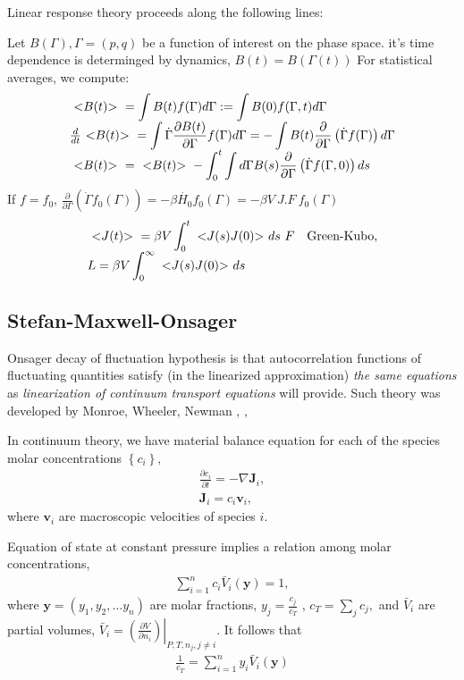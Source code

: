 \documentclass[a4paper, 11 pt]{article}
\theoremstyle{definition}
\theoremstyle{remark}
\newcommand{\dst} {\displaystyle}
\newcommand{\ds} {\dst}
\newcommand{\lt} {\ {\bf <}}
\newcommand{\rt} {{\bf >}\ }
\newcommand{\lb} {\left(}
\newcommand{\rb} {\right)}
\newcommand{\lbr} {\left\{}
\newcommand{\rbr} {\right\}}
\newcommand{\ld} {\left.}
\newcommand{\rv} {\right|}
\newcommand{\be} {\beta}
\newcommand{\bgea}{\begin{equation} \begin{array}{l} }
\newcommand{\enea}{ \end{array} \end{equation}}
\begin{document}
Linear response theory proceeds along the following lines:

Let $B (\Gamma), \Gamma = (p,q)$ be a function of interest on the phase space. it's time dependence is determinged by dynamics, $ B(t) = B (\Gamma (t)) $
For statistical averages, we compute:
\bgea
\lt B(t) \rt = \dst\int B(t) f(\Gamma) d\Gamma := \dst\int B(0) f(\Gamma,t) d\Gamma
\\
\frac{d}{dt} \lt B(t) \rt = \dst\int \dot{\Gamma}\frac{\partial B(t) }{\partial \Gamma} f (\Gamma) d\Gamma = - \dst\int   B(t) \frac{\partial  }{\partial \Gamma} \lb \dot{\Gamma} f (\Gamma)\rb  d\Gamma
\\
\lt B(t) \rt =   \lt B(t) \rt - \ds\int_0^t \dst\int d\Gamma B(s) \frac{\partial  }{\partial \Gamma} \lb \dot{\Gamma} f (\Gamma,0) \rb ds
\enea
If $f=f_0$,   $\frac{\partial  }{\partial \Gamma} \lb \dot{\Gamma} f_0 (\Gamma)\rb = - \be \dot{H_0} f_0 (\Gamma)= -   \be  V \  J.F \ f_0 (\Gamma)$
\bgea
\lt J(t) \rt =  \be V \dst\int_0^t \lt J(s) J(0) \rt ds \ F \quad \mbox{Green-Kubo},
\\
L =   \be V \dst\int_0^{\infty} \lt J(s) J(0) \rt ds
\enea

\subsection{Stefan-Maxwell-Onsager}
Onsager decay of fluctuation hypothesis is that autocorrelation functions of fluctuating quantities satisfy (in the linearized approximation)   {\it the same equations}  as {\it linearization of continuum transport equations} will provide. Such theory was developed by Monroe,  Wheeler, Newman \cite{mwn2006} , \cite{mwn2009} , \cite{mwn2015}


In continuum theory, we have material balance equation for each of the species molar concentrations  $\lbr c_i\rbr,$
\bgea
\dst \frac{\partial c_i}{\partial t} = - \nabla \mathbf{J}_i  ,
\\
\mathbf{J}_i  = c_i \mathbf{v}_i ,
\label{massbalance}
\enea
where $\mathbf{v}_i$ are macroscopic velocities of species $i$.

Equation of state at constant pressure implies a relation among molar concentrations,
\bgea
\dst\sum_{i=1}^n c_i \bar{V}_i \lb \mathbf{y} \rb =1,
\enea
where $\mathbf{y} = (y_1, y_2, \ldots y_n)$ are molar fractions,  $y_j = \frac{c_j}{c_T}$ , $c_T = \sum_j c_j,$ and $\bar{V}_i$ are
partial volumes, $\bar{V}_i =\ld \lb \dst\frac{\partial V}{\partial n_i}\rb \rv_{P,T, n_j,j\neq i}.$
It follows that
\bgea
\dst \frac{1}{c_T} = \dst\sum_{i=1}^n y_i \bar{V}_i \lb \mathbf{y} \rb
\label{cT}
\enea
\end{document}
